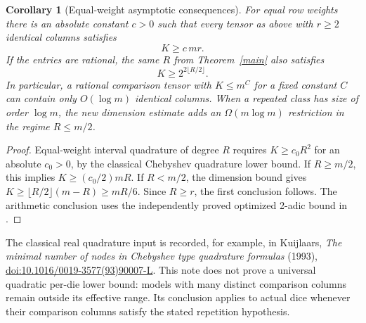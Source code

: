 \documentclass[11pt]{article}
\newtheorem{corollary}{Corollary}
\begin{document}
\begin{corollary}[Equal-weight asymptotic consequences]
For equal row weights there is an absolute constant $c>0$ such that
every tensor as above with $r\ge2$ identical columns satisfies
\[
 K\ge c\,m r.
\]
If the entries are rational, the same $R$ from Theorem~\ref{main}
also satisfies
\[
 K\ge 2^{2\lfloor R/2\rfloor}.
\]
In particular, a rational comparison tensor with $K\le m^C$ for a fixed
constant $C$ can
contain only $O(\log m)$ identical columns. When a repeated class
has size of order $\log m$, the new dimension estimate adds an
$\Omega(m\log m)$ restriction in the regime $R\le m/2$.
\end{corollary}
\begin{proof}
Equal-weight interval quadrature of degree $R$ requires $K\ge c_0R^2$
for an absolute $c_0>0$, by the classical Chebyshev quadrature lower
bound. If $R\ge m/2$, this implies $K\ge(c_0/2)mR$.
If $R<m/2$, the dimension bound gives
$K\ge\lfloor R/2\rfloor(m-R)\ge mR/6$.
Since $R\ge r$, the first conclusion follows.
The arithmetic conclusion uses the independently proved optimized
2-adic bound in
.
\end{proof}

The classical real quadrature input is recorded, for example, in
Kuijlaars, \emph{The minimal number of nodes in Chebyshev type
quadrature formulas} (1993),
\href{https://doi.org/10.1016/0019-3577(93)90007-L}{doi:10.1016/0019-3577(93)90007-L}.
This note does not prove a universal quadratic per-die lower bound:
models with many distinct comparison columns remain outside its
effective range. Its conclusion applies to actual dice whenever
their comparison columns satisfy the stated repetition hypothesis.
\end{document}
